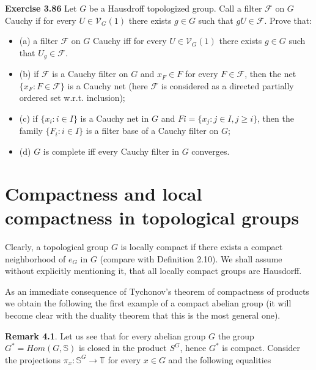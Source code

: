 \documentclass[12pt]{article}
\begin{document}
\textbf{Exercise 3.86} Let $G$ be a Hausdroff topologized group. Call a filter $\mathcal{F}$ on $G$ Cauchy if for every $U \in \mathcal{V}_G(1)$
there exists $g \in G$ such that $gU \in \mathcal{F}$. Prove that:


    \begin{itemize}

        \item (a)  a filter $\mathcal{F}$ on $G$ Cauchy iff for every $U \in \mathcal{V}_G(1)$ there exists $g \in G$ such that $U_g \in \mathcal{F}$.
    
        \item (b) if $\mathcal{F}$ is a Cauchy filter on $G$ and $x_F \in F$ for every $F \in \mathcal{F}$, then the net $\{x_F : F \in \mathcal{F}\}$ is a Cauchy net
        (here $\mathcal{F}$ is considered as a directed partially ordered set w.r.t. inclusion);
        
        \item (c) if $\{x_i: i \in I\}$ is a Cauchy net in $G$ and $Fi = \{x_j : j \in I, j \geq i\}$, then the family $\{F_i: i \in I\}$ is a filter
        base of a Cauchy filter on $G$;
        
        \item (d) $G$ is complete iff every Cauchy filter in $G$ converges.
        
    \end{itemize}


\section{Compactness and local compactness in topological groups}


    Clearly, a topological group $G$ is locally compact if there exists a compact neighborhood of $e_G$ in $G$ (compare
with Definition 2.10). We shall assume without explicitly mentioning it, that all locally compact groups are
Hausdorff.


    As an immediate consequence of Tychonov's theorem of compactness of products we obtain the following
the first example of a compact abelian group (it will become clear with the duality theorem that this is the
most general one).


\textbf{Remark 4.1}. Let us see that for every abelian group $G$ the group $G^* = Hom (G, \mathbb{S})$ is closed in the product
$S^G$, hence $G^*$ is compact. Consider the projections $π_x : \mathbb{S}^G \to \mathbb{T}$ for every $x \in G$ and the following equalities
\end{document}
